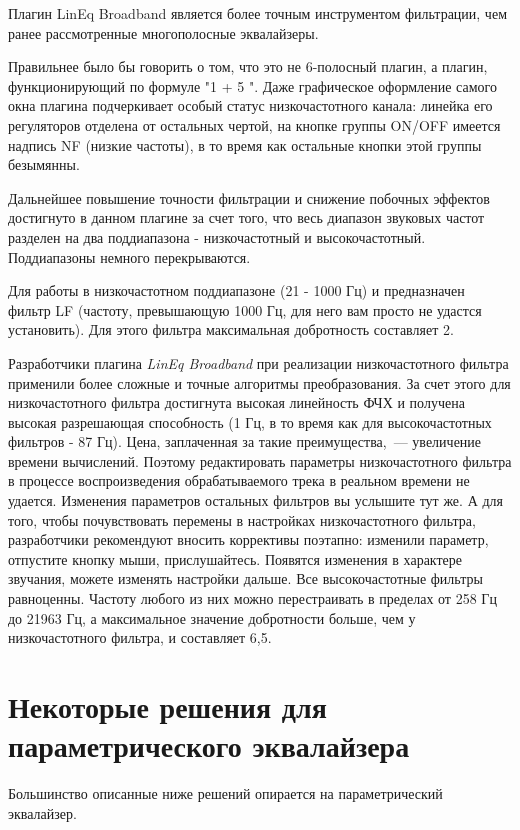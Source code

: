 \documentclass[oneside, final, 14pt]{extreport}
\begin{document}
Плагин LinEq Broadband является более точным инструментом фильтрации, чем ранее рассмотренные многополосные эквалайзеры. 

Правильнее было бы говорить о том, что это не 6-полосный плагин, а плагин, функционирующий по формуле "1 + 5 ". Даже графическое оформление самого окна плагина подчеркивает особый статус низкочастотного канала: линейка его регуляторов отделена от остальных чертой, на кнопке группы ON/OFF имеется надпись NF (низкие частоты), в то время как остальные кнопки этой группы безымянны.

Дальнейшее повышение точности фильтрации и снижение побочных эффектов достигнуто в данном плагине за счет того, что весь диапазон звуковых частот разделен на два поддиапазона - низкочастотный и высокочастотный. Поддиапазоны немного перекрываются.

Для работы в низкочастотном поддиапазоне (21 - 1000 Гц) и предназначен фильтр LF (частоту, превышающую 1000 Гц, для него вам просто не удастся установить). Для этого фильтра максимальная добротность составляет 2.

Разработчики плагина \emph{LinEq Broadband} при реализации низкочастотного фильтра применили более сложные и точные алгоритмы преобразования. За счет этого для низкочастотного фильтра достигнута высокая линейность ФЧХ и получена высокая разрешающая способность (1 Гц, в то время как для высокочастотных фильтров - 87 Гц). Цена, заплаченная за такие преимущества,~--- увеличение времени вычислений. Поэтому редактировать параметры низкочастотного фильтра в процессе воспроизведения обрабатываемого трека в реальном времени не удается. Изменения параметров остальных фильтров вы услышите тут же. А для того, чтобы почувствовать перемены в настройках низкочастотного фильтра, разработчики рекомендуют вносить коррективы поэтапно: изменили параметр, отпустите кнопку мыши, прислушайтесь. Появятся изменения в характере звучания, можете изменять настройки дальше.
Все высокочастотные фильтры равноценны. Частоту любого из них можно перестраивать в пределах от 258 Гц до 21963 Гц, а максимальное значение добротности больше, чем у низкочастотного фильтра, и составляет 6,5.

\section{Некоторые решения для параметрического эквалайзера}

Большинство описанные ниже решений опирается на параметрический эквалайзер.
\end{document}
